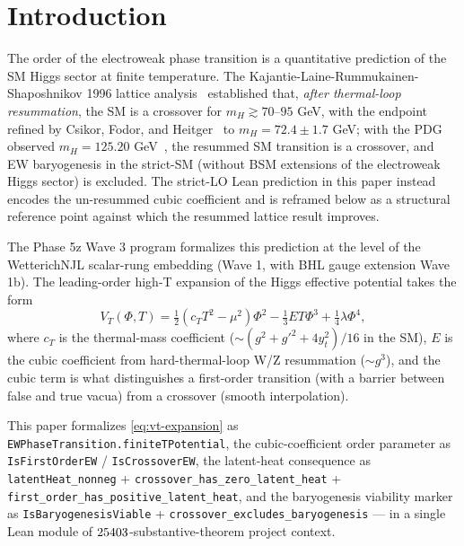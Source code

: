\documentclass[aps,prd,twocolumn,showpacs,superscriptaddress,nofootinbib]{revtex4-2}
\newcommand{\HiggsField}{\Phi}
\newcommand{\CubicCoeff}{E}
\begin{document}

\maketitle

\section{Introduction}
\label{sec:intro}

The order of the electroweak phase transition is a quantitative
prediction of the SM Higgs sector at finite temperature. The
Kajantie-Laine-Rummukainen-Shaposhnikov 1996 lattice
analysis~\cite{KLRS1996} established that, \emph{after thermal-loop
resummation}, the SM is a crossover for $m_H \gtrsim 70$--$95$ GeV,
with the endpoint refined by Csikor, Fodor, and
Heitger~\cite{CsikorFodorHeitger1999} to $m_H = 72.4 \pm 1.7$
GeV; with the PDG observed $m_H = 125.20$
GeV~\cite{PDG2024}, the resummed SM transition is a crossover, and EW
baryogenesis in the strict-SM (without BSM extensions of the
electroweak Higgs sector) is excluded. The strict-LO Lean prediction
in this paper instead encodes the un-resummed cubic coefficient and
is reframed below as a structural reference point against which the
resummed lattice result improves.

The Phase 5z Wave 3 program formalizes this prediction at the level
of the WetterichNJL scalar-rung embedding (Wave 1, with BHL gauge
extension Wave 1b). The leading-order high-T expansion of the Higgs
effective potential takes the form
\begin{equation}
\label{eq:vt-expansion}
V_T(\HiggsField, T) = \tfrac{1}{2} (c_T T^2 - \mu^2) \HiggsField^2
                       - \tfrac{1}{3} \CubicCoeff T \HiggsField^3
                       + \tfrac{1}{4} \lambda \HiggsField^4,
\end{equation}
where $c_T$ is the thermal-mass coefficient ($\sim (g^2 + g'^2 + 4 y_t^2)/16$
in the SM), $\CubicCoeff$ is the cubic coefficient from
hard-thermal-loop W/Z resummation ($\sim g^3$), and the cubic term is
what distinguishes a first-order transition (with a barrier between
false and true vacua) from a crossover (smooth interpolation).

This paper formalizes \eqref{eq:vt-expansion} as
\texttt{EWPhaseTransition.finiteTPotential}, the cubic-coefficient
order parameter as \texttt{IsFirstOrderEW} / \texttt{IsCrossoverEW},
the latent-heat consequence as \texttt{latentHeat\_nonneg} +
\texttt{crossover\_has\_zero\_latent\_heat} +
\texttt{first\_order\_has\_positive\_latent\_heat}, and the
baryogenesis viability marker as
\texttt{IsBaryogenesisViable} +
\texttt{crossover\_excludes\_baryogenesis} --- in a single Lean module
of $25403{}$-substantive-theorem project context.
\end{document}
